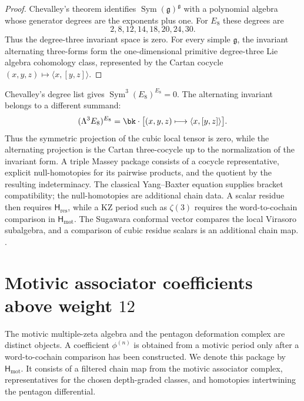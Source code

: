 \begin{proof}
Chevalley's theorem identifies
\(\operatorname{Sym}(\mathfrak g)^{\mathfrak g}\) with a polynomial
algebra whose generator degrees are the exponents plus one.  For
\(E_8\) these degrees are
\[
 2,8,12,14,18,20,24,30.
\]
Thus the degree-three invariant space is zero.  For every simple
\(\mathfrak g\), the invariant alternating three-forms form the
one-dimensional primitive degree-three Lie algebra cohomology class,
represented by the Cartan cocycle
\((x,y,z)\mapsto\langle x,[y,z]\rangle\).
\end{proof}

\begin{remark}
\label{rem:nc-E8-vanishing-cyclic-associator}
Chevalley's degree list gives
\(\operatorname{Sym}^3(E_8)^{E_8}=0\).  The alternating invariant
belongs to a different summand:
\[
 (\Lambda^3E_8)^{E_8}
 =\bk\cdot\bigl[(x,y,z)\longmapsto\langle x,[y,z]\rangle\bigr].
\]
Thus the symmetric projection of the cubic local tensor is zero,
while the alternating projection is the Cartan three-cocycle up to
the normalization of the invariant form.  A triple Massey package
consists of a cocycle representative, explicit null-homotopies for its
pairwise products, and the quotient by the resulting indeterminacy.
The classical Yang--Baxter equation supplies bracket compatibility;
the null-homotopies are additional chain data.  A scalar residue then
requires \(\mathsf H_{\mathrm{res}}\), while a KZ period such as
\(\zeta(3)\) requires the word-to-cochain comparison in
\(\mathsf H_{\mathrm{mot}}\).  The Sugawara conformal vector compares
the local Virasoro subalgebra, and a comparison of cubic residue
scalars is an additional chain map.
\cite{Kohno1985,Sugawara1968,BarNatan1995}.
\end{remark}

\section{Motivic associator coefficients above weight \(12\)}
\label{sec:nc-brown-above-12-double-conditional}

The motivic multiple-zeta algebra and the pentagon deformation complex
are distinct objects.  A coefficient \(\phi^{(n)}\) is obtained from a
motivic period only after a word-to-cochain comparison has been
constructed.  We denote this package by \(\mathsf H_{\mathrm{mot}}\).
It consists of a filtered chain map from the motivic associator
complex, representatives for the chosen depth-graded classes, and
homotopies intertwining the pentagon differential.

